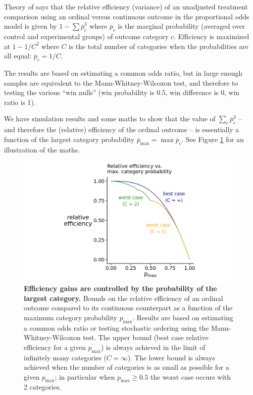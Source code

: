 \documentclass[
  11pt,
  fleqn
]{article}
\begin{document}
Theory of \citep{whiteheadSampleSizeCalculations1993} says that the relative
efficiency (variance) of an unadjusted treatment comparison using an ordinal
versus continuous outcome in the proportional odds model is given by $1 - \sum
\overline p_c^3$ where $\overline p_c$ is the marginal probability (averaged
over control and experimental groups) of outcome category $c$.
Efficiency is maximized at $1 - 1/C^2$ where $C$ is the total number of
categories when the probabilities are all equal: $\overline p_c = 1/C$.

The results are based on estimating a common odds ratio, but in large
enough samples are equivalent to the Mann-Whitney-Wilcoxon test, and
therefore to testing the various ``win nulls'' (win probability is
  0.5, win difference
is 0, win ratio is 1).

We have simulation results and some maths to show that the value of $\sum_c
\overline p_c^3$ -- and therefore the (relative) efficiency of the
ordinal outcome -- is essentially a function of the largest category
probability $\overline{p}_{\max} = \max \overline{p}_c$. See Figure
\ref{fig:p_max} for an illustration of the maths.

\begin{figure}
  \includegraphics[width=6in]{p_max_controls_efficiency.png}
  \caption{\textbf{Efficiency gains are controlled by the probability
    of the largest category.} Bounds on the relative efficiency of an
    ordinal outcome
    compared to its continuous counterpart as a function of the maximum
    category probability $p_\text{max}$. Results are based on
    estimating a common odds ratio or testing stochastic ordering
    using the Mann-Whitney-Wilcoxon test. The upper bound (best case
    relative efficiency for a given $p_\text{max}$) is always achieved in the
    limit of infinitely many categories ($C = \infty$). The lower bound
    is always achieved when the number of categories is as small as
    possible for a given $p_\text{max}$; in particular when
  $p_\text{max} \geq 0.5$ the worst case occurs with 2 categories.}
  \label{fig:p_max}
\end{figure}
\end{document}
